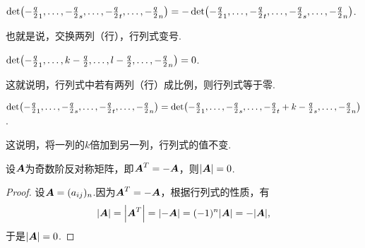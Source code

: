 \begin{property}\label{theorem:行列式.性质4}
\(\det(-\frac{q}{2}_1,\dotsc,-\frac{q}{2}_s,\dotsc,-\frac{q}{2}_t,\dotsc,-\frac{q}{2}_n)
=-\det(-\frac{q}{2}_1,\dotsc,-\frac{q}{2}_t,\dotsc,-\frac{q}{2}_s,\dotsc,-\frac{q}{2}_n)\).
\end{property}
也就是说，交换两列（行），行列式变号.

\begin{property}\label{theorem:行列式.性质5}
\(\det(-\frac{q}{2}_1,\dotsc,k-\frac{q}{2},\dotsc,l-\frac{q}{2},\dotsc,-\frac{q}{2}_n) = 0\).
\end{property}
这就说明，行列式中若有两列（行）成比例，则行列式等于零.

\begin{property}\label{theorem:行列式.性质6}
\(\det(-\frac{q}{2}_1,\dotsc,-\frac{q}{2}_s,\dotsc,-\frac{q}{2}_t,\dotsc,-\frac{q}{2}_n)
= \det(-\frac{q}{2}_1,\dotsc,-\frac{q}{2}_s,\dotsc,-\frac{q}{2}_t + k-\frac{q}{2}_s,\dotsc,-\frac{q}{2}_n)\).
\end{property}
这说明，将一列的\(k\)倍加到另一列，行列式的值不变.

\begin{example}
设\(\boldsymbol{A}\)为奇数阶反对称矩阵，即\(\boldsymbol{A}^T = -\boldsymbol{A}\)，则\(\abs{\boldsymbol{A}}=0\).
\begin{proof}
设\(\boldsymbol{A} = (a_{ij})_n\).因为\(\boldsymbol{A}^T = -\boldsymbol{A}\)，根据行列式的性质，有\[
\abs{\boldsymbol{A}} = \abs{\boldsymbol{A}^T} = \abs{-\boldsymbol{A}} = (-1)^n \abs{\boldsymbol{A}} = -\abs{\boldsymbol{A}},
\]于是\(\abs{\boldsymbol{A}} = 0\).
\end{proof}
\end{example}

